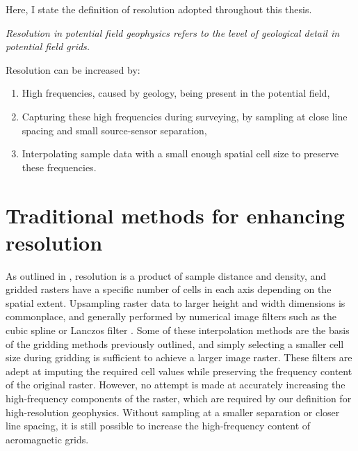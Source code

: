\documentclass[manuscript.tex]{subfiles}
\begin{document}
Here, I state the definition of resolution adopted throughout this thesis.

\bigskip{}
\noindent{}\emph{Resolution in potential field geophysics refers to the level of geological detail in potential field grids.}
\bigskip{}

Resolution can be increased by:
\begin{enumerate}
    \item{} High frequencies, caused by geology, being present in the potential field,
    \item{} Capturing these high frequencies during surveying, by sampling at close line spacing and small source-sensor separation,
    \item{} Interpolating sample data with a small enough spatial cell size to preserve these frequencies.
\end{enumerate}

%

\section{Traditional methods for enhancing resolution}
As outlined in , resolution is a product of sample distance and density, and gridded rasters have a specific number of cells in each axis depending on the spatial extent.
Upsampling raster data to larger height and width dimensions is commonplace, and generally performed by numerical image filters such as the cubic spline \parencite{keysCubicConvolutionInterpolation1981} or Lanczos filter \parencite{lanczos1988applied}.
Some of these interpolation methods are the basis of the gridding methods previously outlined, and simply selecting a smaller cell size during gridding is sufficient to achieve a larger image raster.
These filters are adept at imputing the required cell values while preserving the frequency content of the original raster.
However, no attempt is made at accurately increasing the high-frequency components of the raster, which are required by our definition for high-resolution geophysics.
Without sampling at a smaller separation or closer line spacing, it is still possible to increase the high-frequency content of aeromagnetic grids.
\end{document}
